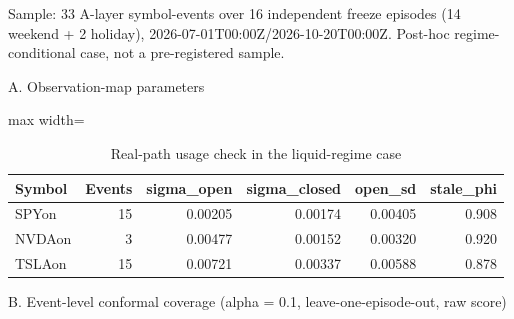 \begin{table}[!ht]
\centering
\scriptsize
\caption{Real-path usage check in the liquid-regime case}
\label{tab:7}
\par\noindent\begin{minipage}{\linewidth}\raggedright{\scriptsize Sample: 33 A-layer symbol-events over 16 independent freeze episodes (14 weekend + 2 holiday), 2026-07-01T00:00Z/2026-10-20T00:00Z. Post-hoc regime-conditional case, not a pre-registered sample.}\end{minipage}\par

\par\noindent\begin{minipage}{\linewidth}\raggedright{\scriptsize A. Observation-map parameters}\end{minipage}\par

\begin{adjustbox}{max width=\linewidth}
\begin{tabular}{@{}lrrrrr@{}}
\toprule
Symbol & Events & sigma\_open & sigma\_closed & open\_sd & stale\_phi \\
\midrule
SPYon & 15 & 0.00205 & 0.00174 & 0.00405 & 0.908 \\
NVDAon & 3 & 0.00477 & 0.00152 & 0.00320 & 0.920 \\
TSLAon & 15 & 0.00721 & 0.00337 & 0.00588 & 0.878 \\
\bottomrule
\end{tabular}
\end{adjustbox}
\vspace{0.5em}
\par\noindent\begin{minipage}{\linewidth}\raggedright{\scriptsize B. Event-level conformal coverage (alpha = 0.1, leave-one-episode-out, raw score)}\end{minipage}\par


\end{table}
